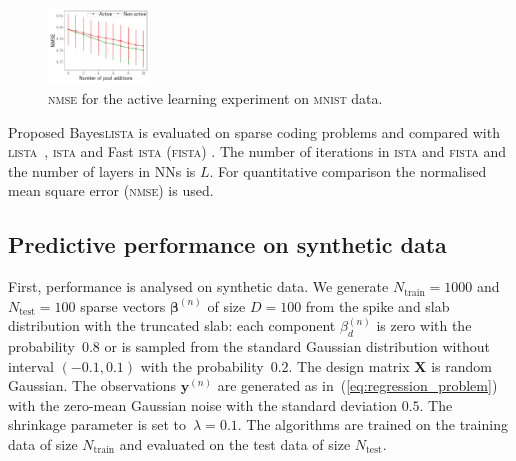 \documentclass{article}
\begin{document}
    \begin{figure}[!t]
  \centering
  \includegraphics[width=0.24\textwidth]{graphics/active_mnist/nmse_validation}
  \caption{\textsc{nmse} for the active learning experiment on \textsc{mnist} data. }
  \label{fig:active_learning_mnist}
  \end{figure}
  
  Proposed Bayes\textsc{lista} is evaluated on sparse coding problems and compared with \textsc{lista}~\cite{gregor2010learning}, \textsc{ista} \cite{daubechies2004iterative} and Fast \textsc{ista} (\textsc{fista}) \cite{beck2009fast}. The number of iterations in \textsc{ista} and \textsc{fista}  and the number of layers in NNs is $L$. For quantitative comparison the normalised mean square error (\textsc{nmse}) is used. %
  
  \subsection{Predictive performance on synthetic data}
  First, performance is analysed on synthetic data. We generate $N_\text{train}=1000$ and $N_{\text{test}} = 100$ sparse vectors $\boldsymbol\beta^{(n)}$ of size $D = 100$  from the spike and slab distribution with the truncated slab: each component $\beta^{(n)}_{d}$ is zero with the probability~$0.8$ or is sampled from the standard Gaussian distribution without interval $(-0.1, 0.1)$ with the probability~$0.2$. The design matrix $\mathbf{X}$ is random Gaussian.  The observations $\mathbf{y}^{(n)}$ are generated as in~(\ref{eq:regression_problem}) with the zero-mean Gaussian noise with the standard deviation $0.5$. The shrinkage parameter is set to~$\lambda = 0.1$. The algorithms are trained on the training data of size $N_\text{train}$ and evaluated on the test data of size $N_{\text{test}}$.
  
\end{document}
